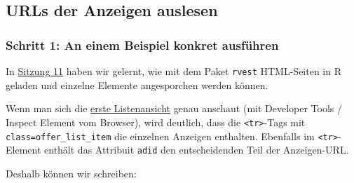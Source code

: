 \documentclass[
  ngerman,
]{article}
\begin{document}
\hypertarget{urls-der-anzeigen-auslesen}{%
\subsection{URLs der Anzeigen auslesen}\label{urls-der-anzeigen-auslesen}}

\hypertarget{schritt-1-an-einem-beispiel-konkret-ausfuxfchren}{%
\subsubsection{Schritt 1: An einem Beispiel konkret ausführen}\label{schritt-1-an-einem-beispiel-konkret-ausfuxfchren}}

In \protect\hyperlink{web-scraping}{Sitzung 11} haben wir gelernt, wie mit dem Paket \texttt{rvest} HTML-Seiten in R geladen und einzelne Elemente angesporchen werden können.

Wenn man sich die \href{https://www.wg-gesucht.de/wg-zimmer-in-Frankfurt-am-Main.41.0.0.0.html}{erste Listenansicht} genau anschaut (mit Developer Tools / Inspect Element vom Browser), wird deutlich, dass die \texttt{\textless{}tr\textgreater{}}-Tags mit \texttt{class=offer\_list\_item} die einzelnen Anzeigen enthalten. Ebenfalls im \texttt{\textless{}tr\textgreater{}}-Element enthält das Attribuit \texttt{adid} den entscheidenden Teil der Anzeigen-URL.

Deshalb können wir schreiben:
\end{document}
